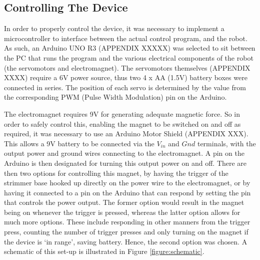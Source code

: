 \documentclass[11pt]{article}
\begin{document}
\pagebreak
\subsection{Controlling The Device}

In order to properly control the device, it was necessary to implement a microcontroller to interface between the actual control program, and the robot. As such, an Arduino UNO R3 (APPENDIX XXXXX) was selected to sit between the PC that runs the program and the various electrical components of the robot (the servomotors and electromagnet). The servomotors themselves (APPENDIX XXXX) require a 6V power source, thus two 4 x AA (1.5V) battery boxes were connected in series. The position of each servo is determined by the value from the corresponding PWM (Pulse Width Modulation) pin on the Arduino. 

The electromagnet requires 9V for generating adequate magnetic force. So in order to safely control this, enabling the magnet to be switched on and off as required, it was necessary to use an Arduino Motor Shield (APPENDIX XXX). This allows a 9V battery to be connected via the $V_{in}$ and $Gnd$ terminals, with the output power and ground wires connecting to the electromagnet. A pin on the Arduino is then designated for turning this output power on and off. There are then two options for controlling this magnet, by having the trigger of the strimmer base hooked up directly on the power wire to the electromagnet, or by having it connected to a pin on the Arduino that can respond by setting the pin that controls the power output. The former option would result in the magnet being on whenever the trigger is pressed, whereas the latter option allows for much more options. These include responding in other manners from the trigger press, counting the number of trigger presses and only turning on the magnet if the device is `in range', saving battery. Hence, the second option was chosen. A schematic of this set-up is illustrated in Figure \ref{figure:schematic}.
\end{document}
